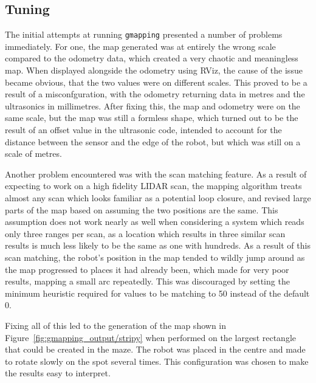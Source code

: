 \subsection{Tuning}\label{soft/SLAM/tuning}

The initial attempts at running \verb|gmapping| presented a number of problems immediately. For one, the map
generated was at entirely the wrong scale compared to the odometry data, which created a very chaotic and meaningless
map. When displayed alongside the odometry using RViz, the cause of the issue became obvious, that the two values were
on different scales. This proved to be a result of a misconfguration, with the odometry returning data in metres and
the ultrasonics in millimetres. After fixing this, the map and odometry were on the same scale, but the map was still
a formless shape, which turned out to be the result of an offset value in the ultrasonic code, intended to account
for the distance between the sensor and the edge of the robot, but which was still on a scale of metres.

Another problem encountered was with the scan matching feature. As a result of expecting to work on a high fidelity
LIDAR scan, the mapping algorithm treats almost any scan which looks familiar as a potential loop closure, and revised
large parts of the map based on assuming the two positions are the same. This assumption does not work nearly as well
when considering a system which reads only three ranges per scan, as a location which results in three similar
scan results is much less likely to be the same as one with hundreds. As a result of this scan matching, the robot's
position in the map tended to wildly jump around as the map progressed to places it had already been, which made for
very poor results, mapping a small arc repeatedly. This was discouraged by setting the minimum heuristic required for
values to be matching to 50 instead of the default 0.

Fixing all of this led to the generation of the map shown in Figure~\ref{fig:gmapping_output/stripy} when performed
on the largest rectangle that could be created in the maze. The robot was placed in the centre and made to rotate
slowly on the spot several times. This configuration was chosen to make the results easy to interpret.


